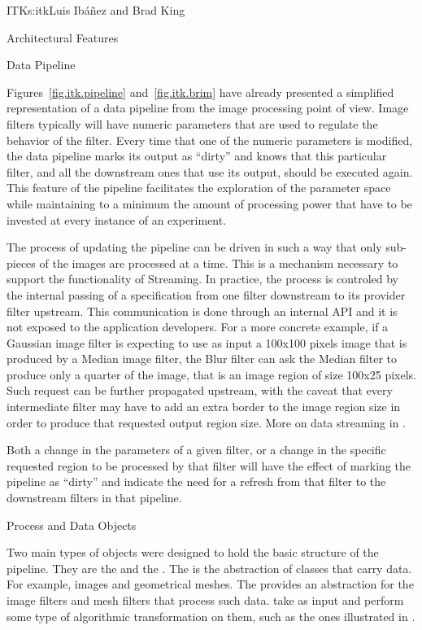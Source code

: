 \begin{aosachapter}{ITK}{s:itk}{Luis Ib\'{a}\~{n}ez and Brad King}
\begin{aosasect1}{Architectural Features}
\begin{aosasect2}{Data Pipeline}
\begin{aosaitemize}
\end{aosaitemize}

Figures~\ref{fig.itk.pipeline} and~\ref{fig.itk.brim} have already presented a
simplified representation of a data pipeline from the image processing point of
view. Image filters typically will have numeric parameters that are used to
regulate the behavior of the filter. Every time that one of the numeric
parameters is modified, the data pipeline marks its output as ``dirty'' and
knows that this particular filter, and all the downstream ones that use its
output, should be executed again. This feature of the pipeline facilitates the
exploration of the parameter space while maintaining to a minimum the amount of
processing power that have to be invested at every instance of an experiment.

The process of updating the pipeline can be driven in such a way that only
sub-pieces of the images are processed at a time. This is a mechanism necessary
to support the functionality of Streaming. In practice, the process is
controled by the internal passing of a  specification
from one filter downstream to its provider filter upstream. This communication
is done through an internal API and it is not exposed to the application
developers. For a more concrete example, if a Gaussian image filter is
expecting to use as input a 100x100 pixels image that is produced by a Median
image filter, the Blur filter can ask the Median filter to produce only a
quarter of the image, that is an image region of size 100x25 pixels.  Such
request can be further propagated upstream, with the caveat that every
intermediate filter may have to add an extra border to the image region size in
order to produce that requested output region size.
More on data streaming in .

Both a change in the parameters of a given filter, or a change in the
specific requested region to be processed by that filter will have the
effect of marking the pipeline as ``dirty'' and indicate the need for
a refresh from that filter to the downstream filters in that pipeline.

\begin{aosasect3}{Process and Data Objects}

Two main types of objects were designed to hold the basic structure of the
pipeline.  They are the  and the . The
 is the abstraction of classes that carry data. For example,
images and geometrical meshes. The  provides an abstraction
for the image filters and mesh filters that process such data.
 take  as input and perform some type of
algorithmic transformation on them, such as the ones illustrated in
.


\end{aosasect3}
\end{aosasect2}
\end{aosasect1}
\end{aosachapter}
